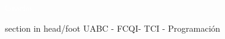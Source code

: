 \begin{frame}[plain, b]
	\centering
	\huge \textcolor{white}{Gracias}
	\normalsize
	\vspace*{\fill}
	
	\begin{beamercolorbox}[wd=\paperwidth]{section in head/foot}
 		\centering
		UABC - FCQI- TCI - Programación
		\vskip10pt
	\end{beamercolorbox}
 \end{frame}